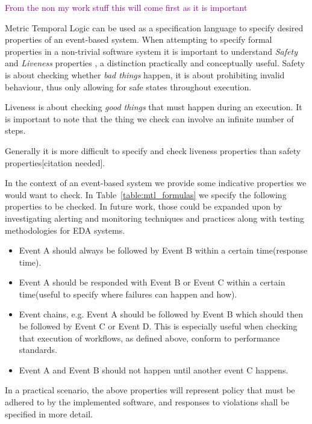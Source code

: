 \documentclass[twocolumn]{article}
\newcommand{\note}[1] {
	\textcolor{Purple}{#1}

}
\begin{document}
\note{From the non my work stuff this will come first as it is important}
Metric Temporal Logic can be used as a specification language to specify desired properties of an event-based system.
When attempting to specify formal properties in a non-trivial software system it is important to understand {\it Safety} and {\it Liveness} properties \cite{lamport_what_1983} , a distinction practically and conceptually useful.
Safety is about checking whether {\it bad things} happen, it is about prohibiting invalid behaviour, thus only allowing for safe states throughout execution.

Liveness is about checking {\it good things} that must happen during an execution. It is important to note that the thing we check can involve an infinite number of steps.

Generally it is more difficult to specify and check liveness properties than safety properties[citation needed].


In the context of an event-based system we provide some indicative properties we would want to check. In Table~\ref{table:mtl_formulas} we specify the following properties to be checked. In future work, those could be expanded upon by investigating alerting and monitoring techniques and practices along with testing methodologies for EDA systems.
\begin{itemize}
	\item Event A should always be followed by Event B within a certain time(response time).
	\item Event A should be responded with Event B or Event C within a certain time(useful to specify where failures can happen and how).
	\item Event chains, e.g. Event A should be followed by Event B which should then be followed by Event C or Event D. This is especially useful when checking that execution of workflows, as defined above, conform to performance standards.
	\item Event A and Event B should not happen until another event C happens.
\end{itemize}
In a practical scenario, the above properties will represent policy that must be adhered to by the implemented software, and responses to violations shall be specified in more detail.
\end{document}
